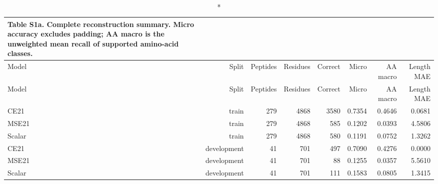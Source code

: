 \begingroup\small\setlength{\tabcolsep}{4pt}\renewcommand{\arraystretch}{1.15}
\begin{longtable}{lrrrrrrr}
\caption*{\textbf{Table S1a.} Complete reconstruction summary. Micro accuracy excludes padding; AA macro is the unweighted mean recall of supported amino-acid classes.}\\
\toprule
Model & Split & Peptides & Residues & Correct & Micro & AA macro & Length MAE \\
\midrule\endfirsthead
Model & Split & Peptides & Residues & Correct & Micro & AA macro & Length MAE \\
\midrule\endhead
CE21 & train & 279 & 4868 & 3580 & 0.7354 & 0.4646 & 0.0681 \\
MSE21 & train & 279 & 4868 & 585 & 0.1202 & 0.0393 & 4.5806 \\
Scalar & train & 279 & 4868 & 580 & 0.1191 & 0.0752 & 1.3262 \\
CE21 & development & 41 & 701 & 497 & 0.7090 & 0.4276 & 0.0000 \\
MSE21 & development & 41 & 701 & 88 & 0.1255 & 0.0357 & 5.5610 \\
Scalar & development & 41 & 701 & 111 & 0.1583 & 0.0805 & 1.3415 \\
\bottomrule\end{longtable}\endgroup
\begingroup\small\setlength{\tabcolsep}{4pt}\renewcommand{\arraystretch}{1.15}
